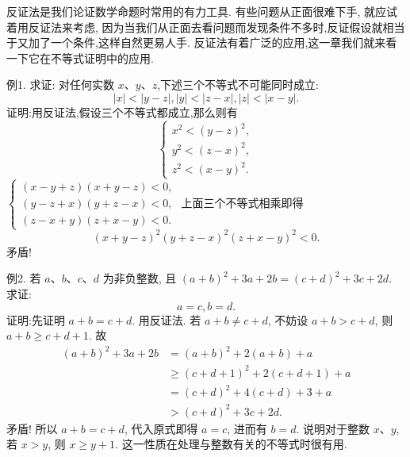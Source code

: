 
反证法是我们论证数学命题时常用的有力工具.
有些问题从正面很难下手, 就应试着用反证法来考虑, 因为当我们从正面去看问题而发现条件不多时,反证假设就相当于又加了一个条件,这样自然更易人手.
反证法有着广泛的应用,这一章我们就来看一下它在不等式证明中的应用.



例1. 求证: 对任何实数 $x 、 y 、 z$,下述三个不等式不可能同时成立:
$$
|x|<|y-z|,|y|<|z-x|,|z|<|x-y| .
$$
证明:用反证法,假设三个不等式都成立,那么则有
$$
\left\{\begin{array}{l}
x^2<(y-z)^2, \\
y^2<(z-x)^2, \\
z^2<(x-y)^2 .
\end{array}\right.
$$
$\left\{\begin{array}{l}(x-y+z)(x+y-z)<0, \\ (y-z+x)(y+z-x)<0, \\ (z-x+y)(z+x-y)<0 .\end{array}\right.$
上面三个不等式相乘即得
$$
(x+y-z)^2(y+z-x)^2(z+x-y)^2<0 .
$$
矛盾!



例2. 若 $a 、 b 、 c 、 d$ 为非负整数, 且 $(a+b)^2+3 a+2 b=(c+d)^2+3 c+ 2 d$. 求证:
$$
a=c, b=d .
$$
证明:先证明 $a+b=c+d$. 用反证法.
若 $a+b \neq c+d$, 不妨设 $a+b>c+d$, 则 $a+b \geqslant c+d+1$. 故
$$
\begin{aligned}
(a+b)^2+3 a+2 b & =(a+b)^2+2(a+b)+a \\
& \geqslant(c+d+1)^2+2(c+d+1)+a \\
& =(c+d)^2+4(c+d)+3+a \\
& >(c+d)^2+3 c+2 d .
\end{aligned}
$$
矛盾! 所以 $a+b=c+d$, 代入原式即得 $a=c$, 进而有 $b=d$.
说明对于整数 $x 、 y$, 若 $x>y$, 则 $x \geqslant y+1$. 这一性质在处理与整数有关的不等式时很有用.



